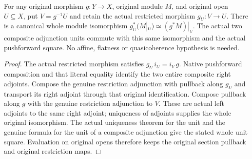 \begin{lemma}
\label{lem:fc-module-pullback-open-restriction}
\leanok
For any original morphism $g:Y\to X$, original module $M$, and original
open $U\subseteq X$, put $V=g^{-1}U$ and retain the actual restricted
morphism $g_U:V\to U$. There is a canonical whole module isomorphism
$g_U^*(M|_U)\simeq(g^*M)|_V$. The actual two composite adjunction units
commute with this same isomorphism and the actual pushforward square.
No affine, flatness or quasicoherence hypothesis is needed.
\end{lemma}
\begin{proof}
The actual restricted morphism satisfies $g_U\,i_U=i_V\,g$.
Native pushforward composition and that literal equality identify the
two entire composite right adjoints. Compose the genuine restriction
adjunction with pullback along $g_U$ and transport its right adjoint
through that original identification. Compose pullback along $g$ with
the genuine restriction adjunction to $V$. These are actual left
adjoints to the same right adjoint; uniqueness of adjoints supplies the
whole original isomorphism. The actual uniqueness theorem for the unit
and the genuine formula for the unit of a composite adjunction give the
stated whole unit square. Evaluation on original opens therefore keeps
the original section pullback and original restriction maps.
\end{proof}
